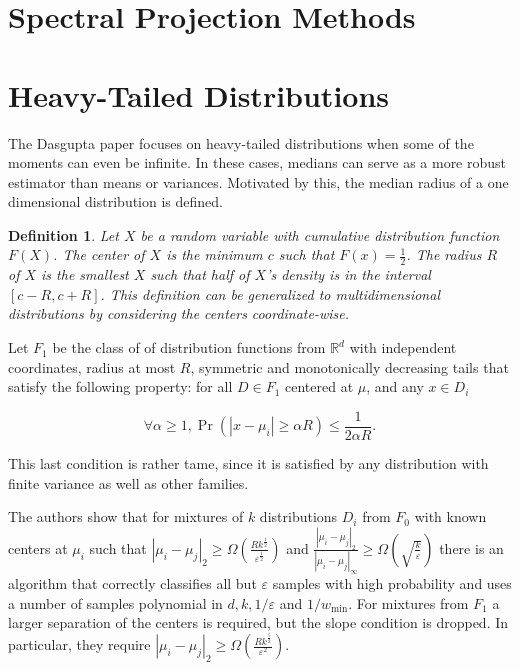 \documentclass[11pt,letter]{article}
\newtheorem{definition}{Definition}
\begin{document}
\section{Spectral Projection Methods}

\section{Heavy-Tailed Distributions}

The Dasgupta paper \cite{1530741} focuses on heavy-tailed distributions when some of the  moments can even be infinite. In these cases, medians can serve as a more robust estimator than means or variances. Motivated by this, the median radius of a one dimensional distribution is defined. 

\begin{definition}
Let $X$ be a random variable with cumulative distribution function $F(X)$. The center of $X$ is the minimum $c$ such that $F(x) = \frac{1}{2}$. The radius $R$ of $X$ is the smallest $X$ such that half of $X$'s density is in the interval $[c-R, c+R]$. This definition can be generalized to multidimensional distributions by considering the centers coordinate-wise. 
\end{definition}

Let $F_1$ be the class of of distribution functions from $\mathbb{R}^d$ with independent coordinates, radius at most $R$, symmetric and monotonically decreasing tails that satisfy the following property: for all $D \in F_1$ centered at ${\mu}$, and any $x \in D_i$ 

$$ \forall \alpha \geq 1, \Pr{(|x-\mu_i| \geq \alpha R)} \leq \frac{1}{2\alpha R}. $$

This last condition is rather tame, since it is satisfied by any distribution with finite variance as well as other families. 

The authors show that for mixtures of $k$ distributions $D_i$ from $F_0$ with known centers at $\mu_i$ such that $| \mu_i - \mu_j |_2 \geq \Omega\left(\frac{Rk^\frac{1}{2}}{\varepsilon^{\frac{1}{2}}} \right)$ and $\frac{|\mu_i - \mu_j|_2}{|\mu_i-\mu_j|_{\infty}} \geq \Omega{\left( \sqrt{\frac{k}{\varepsilon}}\right)}$ there is an algorithm that correctly classifies all but $\varepsilon$ samples with high probability and uses a number of samples polynomial in $d, k, 1/\varepsilon$ and $1/w_{\min}$. For mixtures from $F_1$ a larger separation of the centers is required, but the slope condition is dropped. In particular, they require $|\mu_i - \mu_j |_2 \geq \Omega \left(\frac{Rk^{\frac{5}{2}}}{\varepsilon^{2}}\right)$. 
\end{document}
